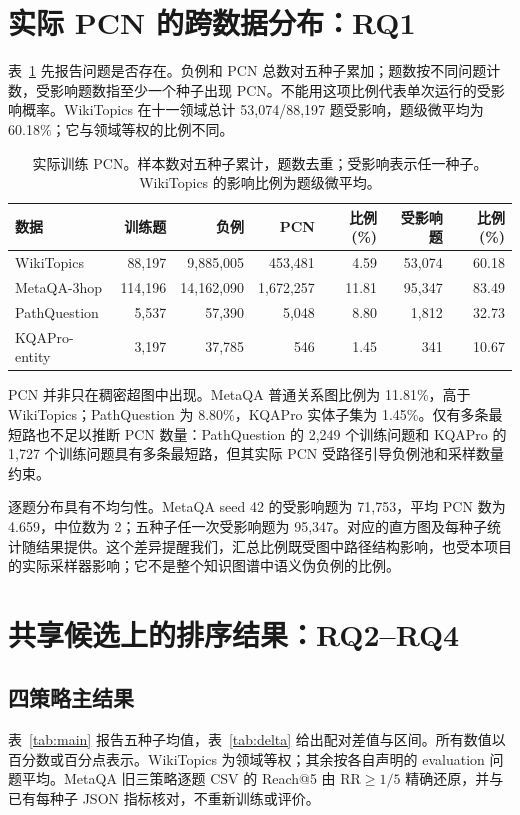 \documentclass[UTF8,a4paper,10pt,fontset=fandol]{ctexart}
\begin{document}
\section{实际 PCN 的跨数据分布：RQ1}
表~\ref{tab:prevalence} 先报告问题是否存在。负例和 PCN 总数对五种子累加；题数按不同问题计数，受影响题数指至少一个种子出现 PCN。不能用这项比例代表单次运行的受影响概率。WikiTopics 在十一领域总计 53,074/88,197 题受影响，题级微平均为 60.18\%；它与领域等权的比例不同。

\begin{table}[tbp]\centering
\caption{实际训练 PCN。样本数对五种子累计，题数去重；受影响表示任一种子。WikiTopics 的影响比例为题级微平均。}\label{tab:prevalence}
\small
\begin{tabular}{lrrrrrr}
\toprule
数据 & 训练题 & 负例 & PCN & 比例(\%) & 受影响题 & 比例(\%) \\
\midrule
WikiTopics & 88,197 & 9,885,005 & 453,481 & 4.59 & 53,074 & 60.18 \\
MetaQA-3hop & 114,196 & 14,162,090 & 1,672,257 & 11.81 & 95,347 & 83.49 \\
PathQuestion & 5,537 & 57,390 & 5,048 & 8.80 & 1,812 & 32.73 \\
KQAPro-entity & 3,197 & 37,785 & 546 & 1.45 & 341 & 10.67 \\
\bottomrule
\end{tabular}
\end{table}

PCN 并非只在稠密超图中出现。MetaQA 普通关系图比例为 11.81\%，高于 WikiTopics；PathQuestion 为 8.80\%，KQAPro 实体子集为 1.45\%。仅有多条最短路也不足以推断 PCN 数量：PathQuestion 的 2,249 个训练问题和 KQAPro 的 1,727 个训练问题具有多条最短路，但其实际 PCN 受路径引导负例池和采样数量约束。

逐题分布具有不均匀性。MetaQA seed 42 的受影响题为 71,753，平均 PCN 数为 4.659，中位数为 2；五种子任一次受影响题为 95,347。对应的直方图及每种子统计随结果提供。这个差异提醒我们，汇总比例既受图中路径结构影响，也受本项目的实际采样器影响；它不是整个知识图谱中语义伪负例的比例。

\section{共享候选上的排序结果：RQ2--RQ4}
\subsection{四策略主结果}
表~\ref{tab:main} 报告五种子均值，表~\ref{tab:delta} 给出配对差值与区间。所有数值以百分数或百分点表示。WikiTopics 为领域等权；其余按各自声明的 evaluation 问题平均。MetaQA 旧三策略逐题 CSV 的 Reach@5 由 $\mathrm{RR}\ge1/5$ 精确还原，并与已有每种子 JSON 指标核对，不重新训练或评价。
\end{document}
